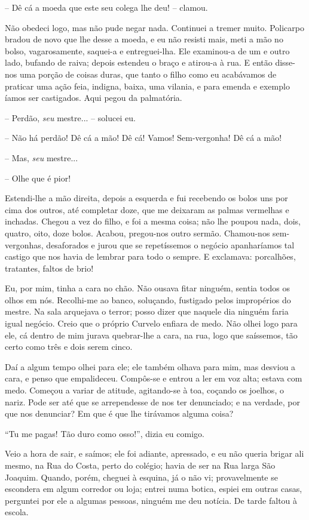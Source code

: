 -- Dê cá a moeda que este seu colega lhe deu! -- clamou.

Não obedeci logo, mas não pude negar nada. Continuei a tremer muito.
Policarpo bradou de novo que lhe desse a moeda, e eu não resisti mais,
meti a mão no bolso, vagarosamente, saquei-a e entreguei-lha. Ele
examinou-a de um e outro lado, bufando de raiva; depois estendeu o braço
e atirou-a à rua. E então disse-nos uma porção de coisas duras, que
tanto o filho como eu acabávamos de praticar uma ação feia, indigna,
baixa, uma vilania, e para emenda e exemplo íamos ser castigados. Aqui
pegou da palmatória.

-- Perdão, \emph{seu} mestre... -- solucei eu.

-- Não há perdão! Dê cá a mão! Dê cá! Vamos! Sem-vergonha! Dê cá a mão!

-- Mas, \emph{seu} mestre...

-- Olhe que é pior!

Estendi-lhe a mão direita, depois a esquerda e fui recebendo os bolos
uns por cima dos outros, até completar doze, que me deixaram as palmas
vermelhas e inchadas. Chegou a vez do filho, e foi a mesma coisa; não
lhe poupou nada, dois, quatro, oito, doze bolos. Acabou, pregou-nos
outro sermão. Chamou-nos sem-vergonhas, desaforados e jurou que se
repetíssemos o negócio apanharíamos tal castigo que nos havia de lembrar
para todo o sempre. E exclamava: porcalhões, tratantes, faltos de brio!

Eu, por mim, tinha a cara no chão. Não ousava fitar ninguém, sentia
todos os olhos em nós. Recolhi-me ao banco, soluçando, fustigado pelos
impropérios do mestre. Na sala arquejava o terror; posso dizer que
naquele dia ninguém faria igual negócio. Creio que o próprio Curvelo
enfiara de medo. Não olhei logo para ele, cá dentro de mim jurava
quebrar-lhe a cara, na rua, logo que saíssemos, tão certo como três e
dois serem cinco.

Daí a algum tempo olhei para ele; ele também olhava para mim, mas
desviou a cara, e penso que empalideceu. Compôs-se e entrou a ler em voz
alta; estava com medo. Começou a variar de atitude, agitando-se à toa,
coçando os joelhos, o nariz. Pode ser até que se arrependesse de nos ter
denunciado; e na verdade, por que nos denunciar? Em que é que lhe
tirávamos alguma coisa?

``Tu me pagas! Tão duro como osso!'', dizia eu comigo.

Veio a hora de sair, e saímos; ele foi adiante, apressado, e eu não
queria brigar ali mesmo, na Rua do Costa, perto do colégio; havia de ser
na Rua larga São Joaquim. Quando, porém, cheguei à esquina, já o não vi;
provavelmente se escondera em algum corredor ou loja; entrei numa
botica, espiei em outras casas, perguntei por ele a algumas pessoas,
ninguém me deu notícia. De tarde faltou à escola.

